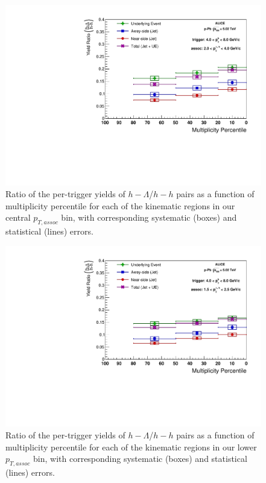 \documentclass[ALICE,manyauthors]{ALICE_analysis_notes}
\begin{document}
\begin{figure}[ht]
\centering
\includegraphics[width=6in]{figures/ratio_plot.pdf}
\caption{Ratio of the per-trigger yields of $h-\Lambda$/$h-h$ pairs as a function of multiplicity percentile for each of the kinematic regions in our central $p_{T, assoc}$ bin, with corresponding systematic (boxes) and statistical (lines) errors. }
\label{ratioplot}
\end{figure}

\clearpage

\begin{figure}[ht]
\centering
\includegraphics[width=6in]{figures/ratio_plot_lowpt.pdf}
\caption{Ratio of the per-trigger yields of $h-\Lambda$/$h-h$ pairs as a function of multiplicity percentile for each of the kinematic regions in our lower $p_{T, assoc}$ bin, with corresponding systematic (boxes) and statistical (lines) errors. }
\label{ratioplot_lowpt}
\end{figure}
\end{document}
